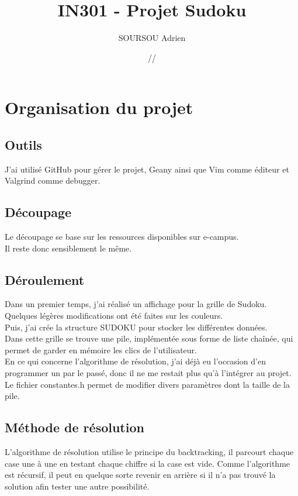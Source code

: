 \documentclass{article}
\title{\textbf{IN301 - Projet Sudoku}}
\author{SOURSOU Adrien}
\date{\oldstylenums{03}/\oldstylenums{01}/\oldstylenums{2019}}
\begin{document}
\maketitle

\newpage
\tableofcontents

\newpage
\section{Organisation du projet}

\subsection{Outils}
J'ai utilisé GitHub pour gérer le projet, Geany ainsi que Vim comme éditeur et Valgrind comme debugger.

\subsection{Découpage}
Le découpage se base sur les ressources disponibles sur e-campus. \\
Il reste donc sensiblement le même.

\subsection{Déroulement}
Dans un premier temps, j'ai réalisé un affichage pour la grille de Sudoku. \\
Quelques légères modifications ont été faites sur les couleurs. \\
Puis, j'ai crée la structure SUDOKU pour stocker les différentes données. \\
Dans cette grille se trouve une pile, implémentée sous forme de liste chaînée, qui permet de garder en mémoire les clics de l'utilisateur. \\
En ce qui concerne l'algorithme de résolution, j'ai déjà eu l'occasion d'en programmer un par le passé, donc il ne me restait plus qu'à l'intégrer au projet. \\
Le fichier constantes.h permet de modifier divers paramètres dont la taille de la pile.

\subsection{Méthode de résolution}
L'algorithme de résolution utilise le principe du backtracking, il parcourt chaque case une à une en testant chaque chiffre si la case est vide. Comme l'algorithme est récursif, il peut en quelque sorte revenir en arrière si il n'a pas trouvé la solution afin tester une autre possibilité.
\end{document}
